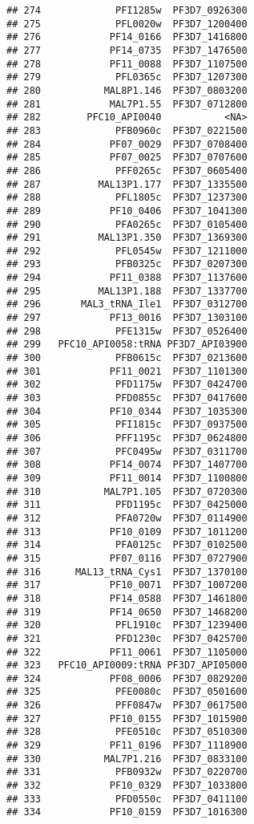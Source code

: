 \documentclass[12pt, a4paper]{article}\usepackage[]{graphicx}\usepackage[]{color}
\makeatletter
\newenvironment{kframe}{%
 \def\at@end@of@kframe{}%
 \ifinner\ifhmode%
  \def\at@end@of@kframe{\end{minipage}}%
  \begin{minipage}{\columnwidth}%
 \fi\fi%
 \def\FrameCommand##1{\hskip\@totalleftmargin \hskip-\fboxsep
 \colorbox{shadecolor}{##1}\hskip-\fboxsep
     \hskip-\linewidth \hskip-\@totalleftmargin \hskip\columnwidth}%
 \MakeFramed {\advance\hsize-\width
   \@totalleftmargin\z@ \linewidth\hsize
   \@setminipage}}%
 {\par\unskip\endMakeFramed%
 \at@end@of@kframe}
\newenvironment{knitrout}{}{} %
\makeatother
\begin{document}
\begin{knitrout}
\begin{kframe}
\begin{verbatim}
## 274             PFI1285w  PF3D7_0926300
## 275             PFL0020w  PF3D7_1200400
## 276            PF14_0166  PF3D7_1416800
## 277            PF14_0735  PF3D7_1476500
## 278            PF11_0088  PF3D7_1107500
## 279             PFL0365c  PF3D7_1207300
## 280           MAL8P1.146  PF3D7_0803200
## 281            MAL7P1.55  PF3D7_0712800
## 282        PFC10_API0040           <NA>
## 283             PFB0960c  PF3D7_0221500
## 284            PF07_0029  PF3D7_0708400
## 285            PF07_0025  PF3D7_0707600
## 286             PFF0265c  PF3D7_0605400
## 287          MAL13P1.177  PF3D7_1335500
## 288             PFL1805c  PF3D7_1237300
## 289            PF10_0406  PF3D7_1041300
## 290             PFA0265c  PF3D7_0105400
## 291          MAL13P1.350  PF3D7_1369300
## 292             PFL0545w  PF3D7_1211000
## 293             PFB0325c  PF3D7_0207300
## 294            PF11_0388  PF3D7_1137600
## 295          MAL13P1.188  PF3D7_1337700
## 296       MAL3_tRNA_Ile1  PF3D7_0312700
## 297            PF13_0016  PF3D7_1303100
## 298             PFE1315w  PF3D7_0526400
## 299   PFC10_API0058:tRNA PF3D7_API03900
## 300             PFB0615c  PF3D7_0213600
## 301            PF11_0021  PF3D7_1101300
## 302             PFD1175w  PF3D7_0424700
## 303             PFD0855c  PF3D7_0417600
## 304            PF10_0344  PF3D7_1035300
## 305             PFI1815c  PF3D7_0937500
## 306             PFF1195c  PF3D7_0624800
## 307             PFC0495w  PF3D7_0311700
## 308            PF14_0074  PF3D7_1407700
## 309            PF11_0014  PF3D7_1100800
## 310           MAL7P1.105  PF3D7_0720300
## 311             PFD1195c  PF3D7_0425000
## 312             PFA0720w  PF3D7_0114900
## 313            PF10_0109  PF3D7_1011200
## 314             PFA0125c  PF3D7_0102500
## 315            PF07_0116  PF3D7_0727900
## 316      MAL13_tRNA_Cys1  PF3D7_1370100
## 317            PF10_0071  PF3D7_1007200
## 318            PF14_0588  PF3D7_1461800
## 319            PF14_0650  PF3D7_1468200
## 320             PFL1910c  PF3D7_1239400
## 321             PFD1230c  PF3D7_0425700
## 322            PF11_0061  PF3D7_1105000
## 323   PFC10_API0009:tRNA PF3D7_API05000
## 324            PF08_0006  PF3D7_0829200
## 325             PFE0080c  PF3D7_0501600
## 326             PFF0847w  PF3D7_0617500
## 327            PF10_0155  PF3D7_1015900
## 328             PFE0510c  PF3D7_0510300
## 329            PF11_0196  PF3D7_1118900
## 330           MAL7P1.216  PF3D7_0833100
## 331             PFB0932w  PF3D7_0220700
## 332            PF10_0329  PF3D7_1033800
## 333             PFD0550c  PF3D7_0411100
## 334            PF10_0159  PF3D7_1016300

\end{verbatim}
\end{kframe}
\end{knitrout}
\end{document}
